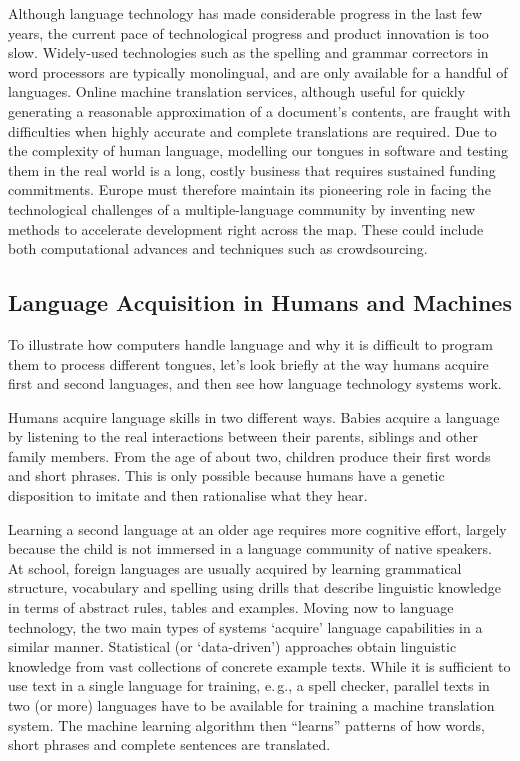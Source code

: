 \begin{multicols}{2}
Although language technology has made considerable progress in the last few years, the current pace of technological progress and product innovation is too slow. Widely-used technologies such as the spelling and grammar correctors in word processors are typically monolingual, and are only available for a handful of languages. 
Online machine translation services, although useful for quickly generating a reasonable approximation of a document’s contents, are fraught with difficulties when highly accurate and complete translations are required. Due to the complexity of human language, modelling our tongues in software and testing them in the real world is a long, costly business that requires sustained funding commitments. Europe must therefore maintain its pioneering role in facing the technological challenges of a multiple-language community by inventing new methods to accelerate development right across the map. These could include both computational advances and techniques such as crowdsourcing.

\subsection{Language Acquisition in Humans and Machines}

To illustrate how computers handle language and why it is difficult to program them to process different tongues, let’s look briefly at the way humans acquire first and second languages, and then see how language technology systems work.

Humans acquire language skills in two different ways. Babies acquire a language by listening to the real interactions between their parents, siblings and other family members. From the age of about two, children produce their first words and short phrases. This is only possible because humans have a genetic disposition to imitate and then rationalise what they hear. 

Learning a second language at an older age requires more cognitive effort, largely because the child is not immersed in a language community of native speakers. At school, foreign languages are usually acquired by learning grammatical structure, vocabulary and spelling using drills that describe linguistic knowledge in terms of abstract rules, tables and examples.
Moving now to language technology, the two main types of systems ‘acquire’ language capabilities in a similar manner. Statistical (or ‘data-driven’) approaches obtain linguistic knowledge from vast collections of concrete example texts. While it is sufficient to use text in a single language for training, e.\,g., a spell checker, parallel texts in two (or more) languages have to be available for training a machine translation system. The machine learning algorithm then “learns” patterns of how words, short phrases and complete sentences are translated. 


\end{multicols}
